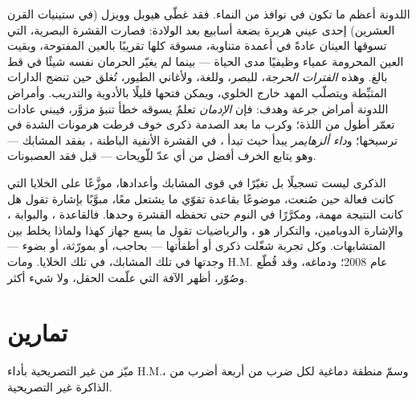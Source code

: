 \begin{definition}\label{def:b3:learning-memory:critical}
اللدونة أعظم ما تكون في نوافذ من النماء. فقد غطّى هيوبل
وويزل (في ستينيات القرن العشرين) إحدى عيني هريرة بضعة أسابيع
بعد الولادة: فصارت القشرة البصرية، التي تسوقها العينان
عادةً في أعمدة متناوبة، مسوقة كلها تقريبًا بالعين المفتوحة،
وبقيت العين المحرومة عمياء وظيفيًا مدى الحياة --- بينما لم
يغيّر الحرمان نفسه شيئًا في قط بالغ. وهذه \emph{الفترات
الحرجة}، للبصر، وللغة، ولأغاني الطيور، تُغلق حين تنضج
الدارات المثبِّطة ويتصلّب المهد خارج الخلوي، ويمكن فتحها
قليلًا بالأدوية والتدريب. وأمراض اللدونة أمراض جرعة وهدف:
فإن \emph{الإدمان} تعلمٌ يسوقه خطأ تنبؤ مزوَّر، فيبني عادات
تعمّر أطول من اللذة؛ وكرب ما بعد الصدمة ذكرى خوف فرطت
هرمونات الشدة في ترسيخها؛ و\emph{داء ألزهايمر} يبدأ حيث
تبدأ ، في القشرة الأنفية الباطنة ،
بفقد المشابك --- وهو يتابع الخرف أفضل من أي عدّ للّويحات
--- قبل فقد العصبونات.
\end{definition}

\begin{remark}\label{rem:b3:learning-memory:what}
الذكرى ليست تسجيلًا بل تغيّرًا في قوى المشابك وأعدادها،
موزَّعًا على الخلايا التي كانت فعالة حين صُنعت، موضوعًا
بقاعدة تقوّي ما يشتعل معًا، مبوَّبًا بإشارة تقول هل كانت
النتيجة مهمة، ومكرَّرًا في النوم حتى تحفظه القشرة وحدها.
فالقاعدة ، والبوابة ، والإشارة
الدوبامين، والتكرار هو ، والرياضيات تقول ما يسع جهاز
كهذا ولماذا يخلط بين المتشابهات. وكل تجربة شغّلت ذكرى أو
أطفأتها --- بحاجب، أو بمورّثة، أو بضوء --- وجدتها في تلك
المشابك، في تلك الخلايا. ومات H.M. عام 2008؛ ودماغه، وقد
قُطّع وصُوّر، أظهر الآفة التي علّمت الحقل، ولا شيء أكثر.
\end{remark}

\section{تمارين}

\begin{exercise}[$\star$]\label{exo:b3:learning-memory:1}
ميّز  من غير التصريحية بأداء H.M.، وسمّ
منطقة دماغية لكل ضرب من أربعة أضرب من الذاكرة غير
التصريحية.
\end{exercise}

